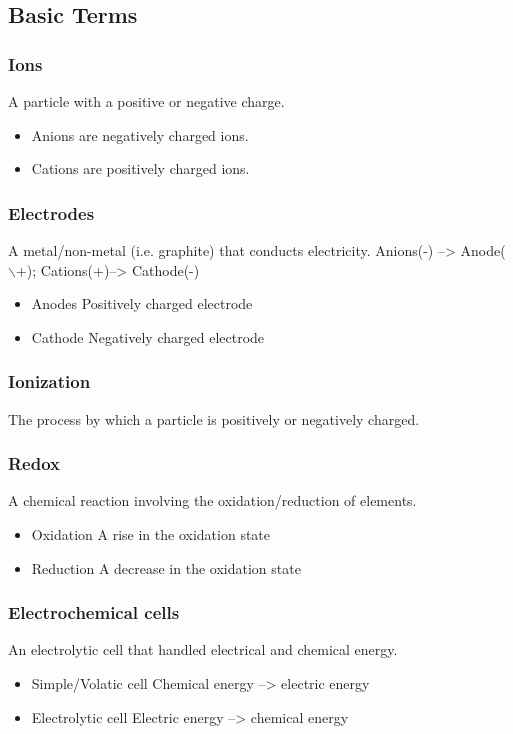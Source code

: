 \documentclass[11pt]{article}
\begin{document}
\subsection{Basic Terms}
\label{sec:org459dcb2}
\subsubsection{Ions}
\label{sec:orgd5aefd2}
A particle with a positive or negative charge.
\begin{itemize}
\item Anions are negatively charged ions.
\item Cations are positively charged ions.
\end{itemize}
\subsubsection{Electrodes}
\label{sec:org73ccfd4}
A metal/non-metal (i.e. graphite) that conducts electricity.
Anions(-) --> Anode($\backslash$+); Cations(+)--> Cathode(-)
\begin{itemize}
\item Anodes
Positively charged electrode
\item Cathode
Negatively charged electrode
\end{itemize}
\subsubsection{Ionization}
\label{sec:org5b8da8d}
The process by which a particle is positively or negatively charged.
\subsubsection{Redox}
\label{sec:org8a887d8}
A chemical reaction involving the oxidation/reduction of elements.
\begin{itemize}
\item Oxidation
A rise in the oxidation state
\item Reduction
A decrease in the oxidation state
\end{itemize}
\subsubsection{Electrochemical cells}
\label{sec:org457fc1b}
An electrolytic cell that handled electrical and chemical energy.
\begin{itemize}
\item Simple/Volatic cell
Chemical energy --> electric energy
\item Electrolytic cell
Electric energy --> chemical energy
\end{itemize}
\end{document}
